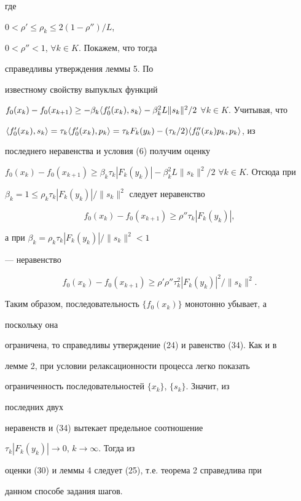 где


$0<\rho'\le\rho_k\le 2(1-\rho'')/L$,


$0<\rho''<1$, $\forall k\in K$. Покажем, что тогда


справедливы утверждения леммы 5. По


известному свойству выпуклых функций


$f_0(x_k)-f_0(x_{k+1})\ge-\beta_k\la f'_0(x_k),s_k\ra-


\beta^2_k L\|s_k\|^2/2$ $\forall k\in K$. Учитывая, что


$\la f'_0(x_k),s_k\ra=\tau_k\la f'_0(x_k),p_k\ra=


\tau_kF_k(y_k)-(\tau_k/2)\la f''_0(x_k)p_k,p_k\ra$, из


последнего неравенства и условия (6) получим оценку


$f_0(x_k)-f_0(x_{k+1})\ge\beta_k\tau_k|F_k(y_k)|-


\beta^2_k L\|s_k\|^2/2$ $\forall k\in K$. Отсюда при


$\beta_k=1\le\rho_k\tau_k|F_k(y_k)|/\|s_k\|^2$ следует неравенство


$$


f_0(x_k)-f_0(x_{k+1})\ge\rho''\tau_k|F_k(y_k)|,


$$


а при $\beta_k=\rho_k\tau_k|F_k(y_k)|/\|s_k\|^2<1$


--- неравенство


$$


f_0(x_k)-f_0(x_{k+1})\ge\rho'\rho''\tau^2_k|F_k(y_k)|^2/


\|s_k\|^2.


$$


Таким образом, последовательность $\{f_0(x_k)\}$ монотонно убывает, а


поскольку она


ограничена, то справедливы утверждение (24) и равенство (34). Как и в


лемме 2, при условии релаксационности процесса легко показать


ограниченность последовательностей $\{x_k\}$, $\{s_k\}$. Значит, из


последних двух


неравенств и (34) вытекает предельное соотношение


$\tau_k|F_k(y_k)|\to 0$, $k\to\infty$. Тогда из


оценки (30) и леммы 4 следует (25), т.е. теорема 2 справедлива при


данном способе задания шагов.






